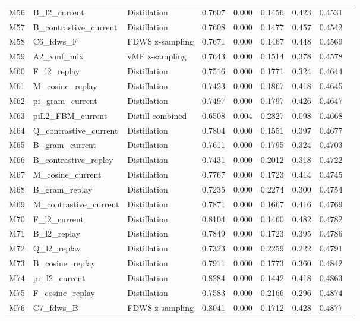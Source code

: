 \documentclass[11pt,a4paper]{article}
\begin{document}
\begin{small}
\begin{longtable}{llp{3cm}rrrrrr}
    M56 & B\_l2\_current & Distillation & 0.7607 & 0.000 & 0.1456 & 0.423 & 0.4531 \\
    M57 & B\_contrastive\_current & Distillation & 0.7608 & 0.000 & 0.1477 & 0.457 & 0.4542 \\
    M58 & C6\_fdws\_F & FDWS z-sampling & 0.7671 & 0.000 & 0.1467 & 0.448 & 0.4569 \\
    M59 & A2\_vmf\_mix & vMF z-sampling & 0.7643 & 0.000 & 0.1514 & 0.378 & 0.4578 \\
    M60 & F\_l2\_replay & Distillation & 0.7516 & 0.000 & 0.1771 & 0.324 & 0.4644 \\
    M61 & M\_cosine\_replay & Distillation & 0.7423 & 0.000 & 0.1867 & 0.418 & 0.4645 \\
    M62 & pi\_gram\_current & Distillation & 0.7497 & 0.000 & 0.1797 & 0.426 & 0.4647 \\
    M63 & piL2\_FBM\_current & Distill combined & 0.6508 & 0.004 & 0.2827 & 0.098 & 0.4668 \\
    M64 & Q\_contrastive\_current & Distillation & 0.7804 & 0.000 & 0.1551 & 0.397 & 0.4677 \\
    M65 & B\_gram\_current & Distillation & 0.7611 & 0.000 & 0.1795 & 0.324 & 0.4703 \\
    M66 & B\_contrastive\_replay & Distillation & 0.7431 & 0.000 & 0.2012 & 0.318 & 0.4722 \\
    M67 & M\_cosine\_current & Distillation & 0.7767 & 0.000 & 0.1723 & 0.414 & 0.4745 \\
    M68 & B\_gram\_replay & Distillation & 0.7235 & 0.000 & 0.2274 & 0.300 & 0.4754 \\
    M69 & M\_contrastive\_current & Distillation & 0.7871 & 0.000 & 0.1667 & 0.416 & 0.4769 \\
    M70 & F\_l2\_current & Distillation & 0.8104 & 0.000 & 0.1460 & 0.482 & 0.4782 \\
    M71 & B\_l2\_replay & Distillation & 0.7849 & 0.000 & 0.1723 & 0.395 & 0.4786 \\
    M72 & Q\_l2\_replay & Distillation & 0.7323 & 0.000 & 0.2259 & 0.222 & 0.4791 \\
    M73 & B\_cosine\_replay & Distillation & 0.7911 & 0.000 & 0.1773 & 0.360 & 0.4842 \\
    M74 & pi\_l2\_current & Distillation & 0.8284 & 0.000 & 0.1442 & 0.418 & 0.4863 \\
    M75 & F\_cosine\_replay & Distillation & 0.7583 & 0.000 & 0.2166 & 0.296 & 0.4874 \\
    M76 & C7\_fdws\_B & FDWS z-sampling & 0.8041 & 0.000 & 0.1712 & 0.428 & 0.4877 \\

\end{longtable}
\end{small}
\end{document}
